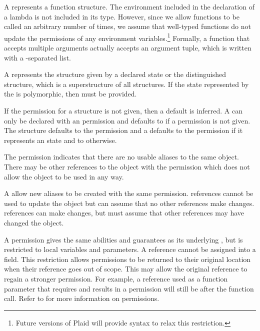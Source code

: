 A  represents a function structure.  
The environment included in the declaration of a lambda is
not included in its type.  However, since we allow functions to
be called an arbitrary number of times, we assume that well-typed
functions do not update the permissions of any environment variables.\footnote{
Future versions of Plaid will provide syntax to relax this restriction.}
Formally, a function that accepts multiple arguments actually accepts an
argument tuple, which is written with a \code{*}-separated list.

A  represents the structure 
given by a declared state
or the distinguished  structure, which is a superstructure
of all structures.  If the state represented by the 
is polymorphic, then  must be provided.

If the permission for a structure is not given, then a default is inferred.
A  can only be declared with 
an  permission and defaults to 
if a permission is not given.  The  structure 
defaults to the  permission and a  defaults 
to the  permission if it represents an 
 state and to  otherwise. 

The  permission indicates that there are no
usable aliases to the same object.  There may be other
references to the object with the  permission
which does not allow the object to be used in any way.

A  allow new aliases to be 
created with the same permission.
 references cannot be used to update the object
but can assume that no other references make changes. 
 references can make changes, but must assume that other
references may have changed the object.

A  permission gives the same abilities
and guarantees as its underlying , 
but is restricted to local variables and parameters.  
A  reference cannot be assigned into a field.
This restriction allows  permissions to be
returned to their original location when their reference goes out of 
scope.  This may allow the original reference to regain a stronger permission.
For example, a  reference used as a function parameter
that requires and results in a  permission will
still be  after the function call.  Refer to \cite{naden12:borrowingPermissions}
for more information on  permissions.

